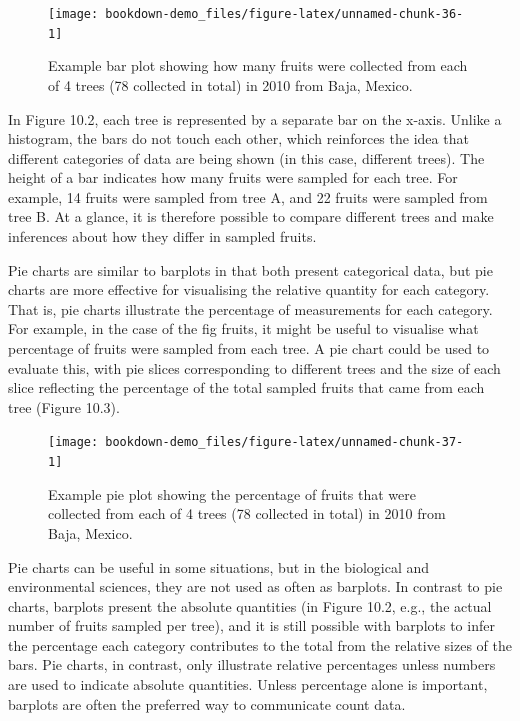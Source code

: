 \documentclass[
]{scrbook}
\begin{document}
\begin{figure}
\texttt{[image: bookdown-demo\_files/figure-latex/unnamed-chunk-36-1]} \caption{Example bar plot showing how many fruits were collected from each of 4 trees (78 collected in total) in 2010 from Baja, Mexico.}\label{fig:unnamed-chunk-36}
\end{figure}

In Figure 10.2, each tree is represented by a separate bar on the x-axis.
Unlike a histogram, the bars do not touch each other, which reinforces the idea that different categories of data are being shown (in this case, different trees).
The height of a bar indicates how many fruits were sampled for each tree.
For example, 14 fruits were sampled from tree A, and 22 fruits were sampled from tree B.
At a glance, it is therefore possible to compare different trees and make inferences about how they differ in sampled fruits.

Pie charts are similar to barplots in that both present categorical data, but pie charts are more effective for visualising the relative quantity for each category.
That is, pie charts illustrate the percentage of measurements for each category.
For example, in the case of the fig fruits, it might be useful to visualise what percentage of fruits were sampled from each tree.
A pie chart could be used to evaluate this, with pie slices corresponding to different trees and the size of each slice reflecting the percentage of the total sampled fruits that came from each tree (Figure 10.3).

\begin{figure}
\texttt{[image: bookdown-demo\_files/figure-latex/unnamed-chunk-37-1]} \caption{Example pie plot showing the percentage of fruits that were collected from each of 4 trees (78 collected in total) in 2010 from Baja, Mexico.}\label{fig:unnamed-chunk-37}
\end{figure}

Pie charts can be useful in some situations, but in the biological and environmental sciences, they are not used as often as barplots.
In contrast to pie charts, barplots present the absolute quantities (in Figure 10.2, e.g., the actual number of fruits sampled per tree), and it is still possible with barplots to infer the percentage each category contributes to the total from the relative sizes of the bars.
Pie charts, in contrast, only illustrate relative percentages unless numbers are used to indicate absolute quantities.
Unless percentage alone is important, barplots are often the preferred way to communicate count data.
\end{document}
